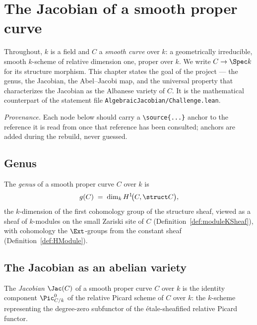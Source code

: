 \chapter{The Jacobian of a smooth proper curve}
\label{chap:Challenge}

Throughout, \(k\) is a field and \(C\) a \emph{smooth curve} over \(k\): a geometrically
irreducible, smooth \(k\)-scheme of relative dimension one, proper over \(k\). We write
\(C \to \Spec k\) for its structure morphism. This chapter states the goal of the project — the
genus, the Jacobian, the Abel--Jacobi map, and the universal property that characterizes the
Jacobian as the Albanese variety of \(C\). It is the mathematical counterpart of the statement file
\texttt{AlgebraicJacobian/Challenge.lean}.

\emph{Provenance.} Each node below should carry a \verb!\source{...}! anchor to the reference it is
read from once that reference has been consulted; anchors are added during the rebuild, never
guessed.

\section{Genus}

\begin{definition}[Genus]
  \label{def:genus}
  \leanok
  The \emph{genus} of a smooth proper curve \(C\) over \(k\) is
  \[
    g(C) \;=\; \dim_k H^1\!\bigl(C, \struct C\bigr),
  \]
  the \(k\)-dimension of the first cohomology group of the structure sheaf, viewed as a sheaf
  of \(k\)-modules on the small Zariski site of \(C\) (Definition~\ref{def:moduleKSheaf}),
  with cohomology the \(\Ext\)-groups from the constant sheaf
  (Definition~\ref{def:HModule}).
\end{definition}

\section{The Jacobian as an abelian variety}

\begin{definition}[Jacobian]
 \label{def:jacobian}
  The \emph{Jacobian} \(\Jac(C)\) of a smooth proper curve \(C\) over \(k\) is the identity
  component \(\Pic^0_{C/k}\) of the relative Picard scheme of \(C\) over \(k\): the \(k\)-scheme
  representing the degree-zero subfunctor of the \'etale-sheafified relative Picard functor.
\end{definition}

